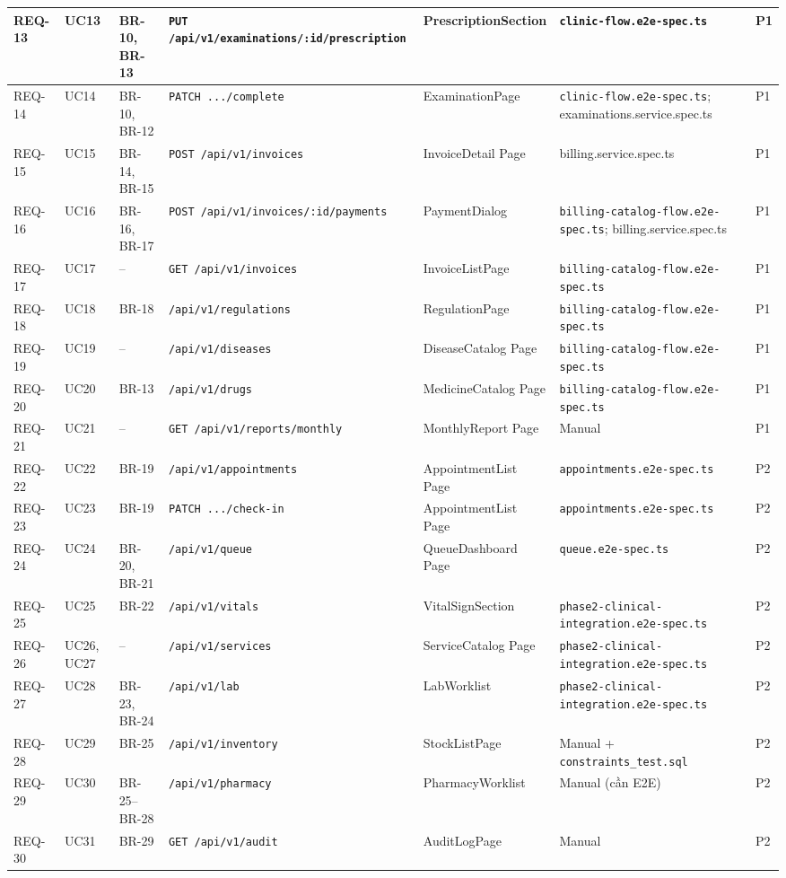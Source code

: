\begin{longtable}{|p{1.3cm}|p{1.3cm}|p{1.6cm}|p{2.7cm}|p{2.2cm}|p{2.5cm}|p{1.3cm}|}
\hline
REQ-13 & UC13 & BR-10, BR-13 & \texttt{PUT /api/v1/examinations/:id/prescription} & PrescriptionSection & \texttt{clinic-flow.e2e-spec.ts} & P1 \\
\hline
REQ-14 & UC14 & BR-10, BR-12 & \texttt{PATCH .../complete} & ExaminationPage & \texttt{clinic-flow.e2e-spec.ts}; examinations.service.spec.ts & P1 \\
\hline
REQ-15 & UC15 & BR-14, BR-15 & \texttt{POST /api/v1/invoices} & InvoiceDetail Page & billing.service.spec.ts & P1 \\
\hline
REQ-16 & UC16 & BR-16, BR-17 & \texttt{POST /api/v1/invoices/:id/payments} & PaymentDialog & \texttt{billing-catalog-flow.e2e-spec.ts}; billing.service.spec.ts & P1 \\
\hline
REQ-17 & UC17 & -- & \texttt{GET /api/v1/invoices} & InvoiceListPage & \texttt{billing-catalog-flow.e2e-spec.ts} & P1 \\
\hline
REQ-18 & UC18 & BR-18 & \texttt{/api/v1/regulations} & RegulationPage & \texttt{billing-catalog-flow.e2e-spec.ts} & P1 \\
\hline
REQ-19 & UC19 & -- & \texttt{/api/v1/diseases} & DiseaseCatalog Page & \texttt{billing-catalog-flow.e2e-spec.ts} & P1 \\
\hline
REQ-20 & UC20 & BR-13 & \texttt{/api/v1/drugs} & MedicineCatalog Page & \texttt{billing-catalog-flow.e2e-spec.ts} & P1 \\
\hline
REQ-21 & UC21 & -- & \texttt{GET /api/v1/reports/monthly} & MonthlyReport Page & Manual & P1 \\
\hline
REQ-22 & UC22 & BR-19 & \texttt{/api/v1/appointments} & AppointmentList Page & \texttt{appointments.e2e-spec.ts} & P2 \\
\hline
REQ-23 & UC23 & BR-19 & \texttt{PATCH .../check-in} & AppointmentList Page & \texttt{appointments.e2e-spec.ts} & P2 \\
\hline
REQ-24 & UC24 & BR-20, BR-21 & \texttt{/api/v1/queue} & QueueDashboard Page & \texttt{queue.e2e-spec.ts} & P2 \\
\hline
REQ-25 & UC25 & BR-22 & \texttt{/api/v1/vitals} & VitalSignSection & \texttt{phase2-clinical-integration.e2e-spec.ts} & P2 \\
\hline
REQ-26 & UC26, UC27 & -- & \texttt{/api/v1/services} & ServiceCatalog Page & \texttt{phase2-clinical-integration.e2e-spec.ts} & P2 \\
\hline
REQ-27 & UC28 & BR-23, BR-24 & \texttt{/api/v1/lab} & LabWorklist & \texttt{phase2-clinical-integration.e2e-spec.ts} & P2 \\
\hline
REQ-28 & UC29 & BR-25 & \texttt{/api/v1/inventory} & StockListPage & Manual + \texttt{constraints\_test.sql} & P2 \\
\hline
REQ-29 & UC30 & BR-25--BR-28 & \texttt{/api/v1/pharmacy} & PharmacyWorklist & Manual (cần E2E) & P2 \\
\hline
REQ-30 & UC31 & BR-29 & \texttt{GET /api/v1/audit} & AuditLogPage & Manual & P2 \\
\hline
\end{longtable}

